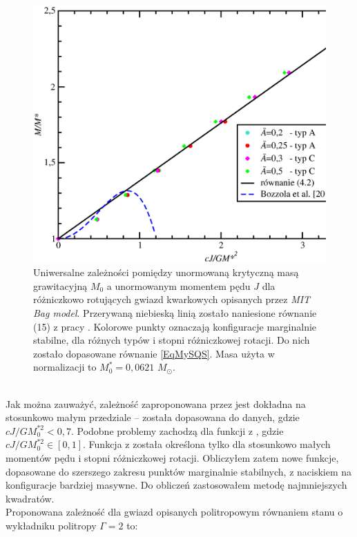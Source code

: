 \documentclass{bachelor_thesis}
\begin{document}
            \begin{figure}[h!]
            \centering
            \includegraphics[scale=.45]{figures/RysUniSQS.eps}
            \caption{Uniwersalne zależności pomiędzy unormowaną krytyczną masą grawitacyjną $M_0$ a unormowanym momentem pędu $J$ dla różniczkowo rotujących gwiazd kwarkowych opisanych przez \textit{MIT Bag model}. Przerywaną niebieską linią zostało naniesione równanie (15) z pracy \cite{Bozzola2018}. Kolorowe punkty oznaczają konfiguracje marginalnie stabilne, dla różnych typów i stopni różniczkowej rotacji. Do nich zostało dopasowane równanie \ref{EqMySQS}. Masa użyta w normalizacji to $M^*_0=0,0621$ $M_\odot$.}
            \label{RysUniSQS}
            \end{figure}\\
            \indent Jak można zauważyć, zależność zaproponowana przez \cite{Bozzola2018} jest dokładna na stosunkowo małym przedziale -- została dopasowana do danych, gdzie $cJ/GM_0^{*2}<0,7$. Podobne problemy zachodzą dla funkcji z \cite{Breu2016}, gdzie $cJ/GM_0^{*2}\in[0,1]$. Funkcja z \cite{Weih2018} została określona tylko dla stosunkowo małych momentów pędu i stopni różniczkowej rotacji. Obliczyłem zatem nowe funkcje, dopasowane do szerszego zakresu punktów marginalnie stabilnych, z naciskiem na konfiguracje bardziej masywne. Do obliczeń zastosowałem metodę najmniejszych kwadratów. \\
            \indent Proponowana zależność dla gwiazd opisanych politropowym równaniem stanu o wykładniku politropy $\Gamma=2$ to:
\end{document}
